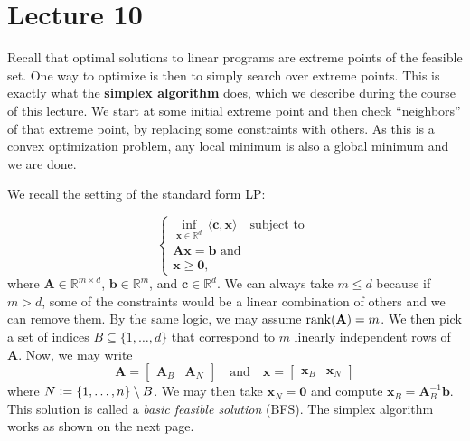 \section{Lecture 10}

Recall that optimal solutions to linear programs are extreme points of the feasible set. One way to optimize is then to simply search over extreme points. This is exactly what the \textbf{simplex algorithm} does, which we describe during the course of this lecture. We start at some initial extreme point and then check ``neighbors'' of that extreme point, by replacing some constraints with others. As this is a convex optimization problem, any local minimum is also a global minimum and we are done. 

We recall the setting of the standard form LP:

\[
    \begin{cases}
        \displaystyle\inf_{\mathbf{x} \in \mathbb{R}^d} \, \langle \mathbf{c}, \mathbf{x} \rangle \quad \text{subject to } \\
        \mathbf{Ax} = \mathbf{b} \text{ and } \\
        \mathbf{x} \geq \mathbf{0},
    \end{cases}
\]
where $\mathbf{A} \in \mathbb{R}^{m \times d}$, $\mathbf{b} \in \mathbb{R}^m$, and $\mathbf{c} \in \mathbb{R}^d$. We can always take $m \leq d$ because if $m > d$, some of the constraints would be a linear combination of others and we can remove them. By the same logic, we may assume $\rank(\mathbf{A}) = m$. We then pick a set of indices $B \subseteq \{1, \ldots, d\}$ that correspond to $m$ linearly independent rows of $\mathbf{A}$. Now, we may write
\[
    \mathbf{A} = \begin{bmatrix}
        \mathbf{A}_B & \mathbf{A}_N 
    \end{bmatrix} \quad \text{and} \quad \mathbf{x} = \begin{bmatrix}
        \mathbf{x}_B & \mathbf{x}_N
    \end{bmatrix}
\]
where $N \vcentcolon= \{1, \ldots, n\} \setminus B$. We may then take $\mathbf{x}_N = \mathbf{0}$ and compute $\mathbf{x}_B = \mathbf{A}_B^{-1} \mathbf{b}$. This solution is called a \textit{basic feasible solution} (BFS). The simplex algorithm works as shown on the next page. 

